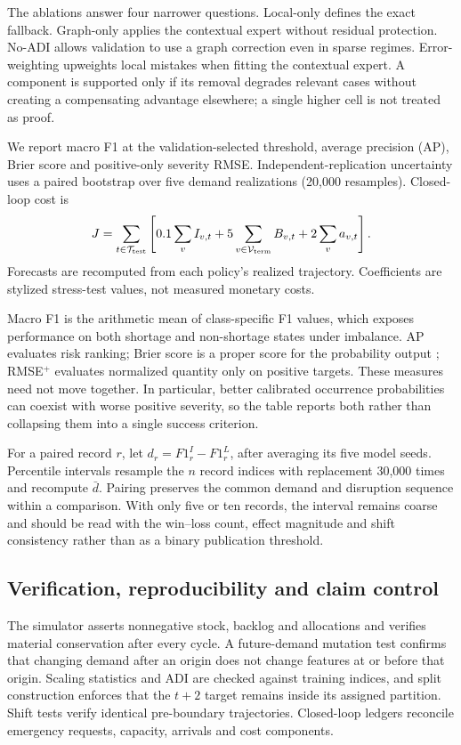 \documentclass[11pt,a4paper]{article}
\begin{document}
The ablations answer four narrower questions. Local-only defines the exact fallback. Graph-only applies the contextual expert without residual protection. No-ADI allows validation to use a graph correction even in sparse regimes. Error-weighting upweights local mistakes when fitting the contextual expert. A component is supported only if its removal degrades relevant cases without creating a compensating advantage elsewhere; a single higher cell is not treated as proof.

We report macro F1 at the validation-selected threshold, average precision (AP), Brier score and positive-only severity RMSE. Independent-replication uncertainty uses a paired bootstrap over five demand realizations (20,000 resamples). Closed-loop cost is
\begin{equation}J=\sum_{t\in\mathcal T_{\rm test}}\left[0.1\sum_v I_{v,t}+5\sum_{v\in\mathcal V_{\rm term}}B_{v,t}+2\sum_v a_{v,t}\right].\end{equation}
Forecasts are recomputed from each policy's realized trajectory. Coefficients are stylized stress-test values, not measured monetary costs.

Macro F1 is the arithmetic mean of class-specific F1 values, which exposes performance on both shortage and non-shortage states under imbalance. AP evaluates risk ranking; Brier score is a proper score for the probability output \cite{brier}; RMSE$^+$ evaluates normalized quantity only on positive targets. These measures need not move together. In particular, better calibrated occurrence probabilities can coexist with worse positive severity, so the table reports both rather than collapsing them into a single success criterion.

For a paired record $r$, let $d_r=F1^{I}_r-F1^{L}_r$, after averaging its five model seeds. Percentile intervals resample the $n$ record indices with replacement 30,000 times and recompute $\bar d$. Pairing preserves the common demand and disruption sequence within a comparison. With only five or ten records, the interval remains coarse and should be read with the win--loss count, effect magnitude and shift consistency rather than as a binary publication threshold.

\subsection{Verification, reproducibility and claim control}
The simulator asserts nonnegative stock, backlog and allocations and verifies material conservation after every cycle. A future-demand mutation test confirms that changing demand after an origin does not change features at or before that origin. Scaling statistics and ADI are checked against training indices, and split construction enforces that the $t+2$ target remains inside its assigned partition. Shift tests verify identical pre-boundary trajectories. Closed-loop ledgers reconcile emergency requests, capacity, arrivals and cost components.
\end{document}
